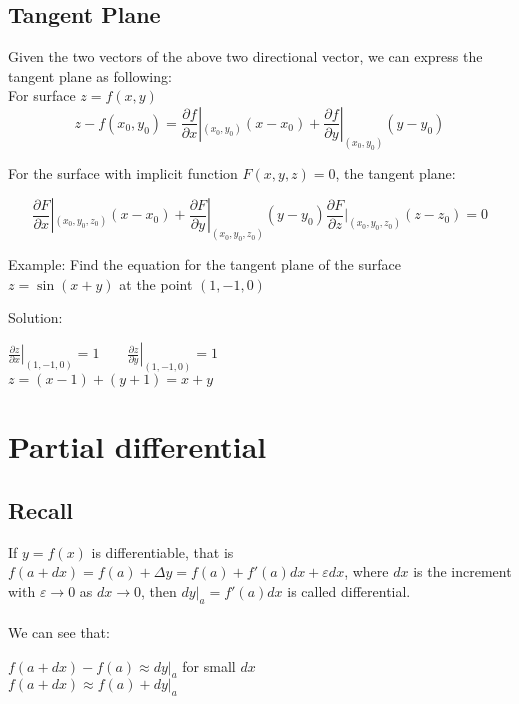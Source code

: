 \documentclass[UTF8,a4paper, 10pt, openany]{svmono}
\begin{document}
\subsection{Tangent Plane}
Given the two vectors of the above two directional vector, we can express the tangent plane as following: \\

For surface $z=f(x,y)$
\begin{equation}
\boxed{z-f(x_0,y_0)=\frac{\partial f}{\partial x}|_{(x_0,y_0)}(x-x_0)+\frac{\partial f}{\partial y}|_{(x_0,y_0)}(y-y_0)}
\end{equation}

For the surface with implicit function $F(x,y,z)=0$, the tangent plane:

\begin{equation}
\boxed{\frac{\partial F}{\partial x}|_{(x_0,y_0,z_0)}(x-x_0)+\frac{\partial F}{\partial y}|_{(x_0,y_0,z_0)}(y-y_0)\frac{\partial F}{\partial z}|_{(x_0,y_0,z_0)}(z-z_0)=0}
\end{equation}

Example: Find the equation for the tangent plane of the surface $z=\sin (x+y)$ at the point $(1,-1,0)$

Solution:
\begin{center}
$\left. \frac{\partial z}{\partial x} \right|_{(1,-1,0)}=1 \qquad \left. \frac{\partial z}{\partial y} \right|_{(1,-1,0)}=1$\\
$z=(x-1)+(y+1)=x+y$
\end{center}

\section{Partial differential}
\subsection{Recall}
If $y=f(x)$ is differentiable, that is $f(a+dx)=f(a)+\Delta y=f(a)+f'(a)dx+\varepsilon dx$, where $dx$ is the increment with $\varepsilon \to 0$ as $dx \to 0$, then $dy|_{a}=f'(a)dx$ is called differential.\\ \\

We can see that:

\begin{center}
$f(a+dx)-f(a)\approx dy|_{a}$ for small $dx$\\
$f(a+dx)\approx f(a)+dy|_{a}$
\end{center}
\end{document}
